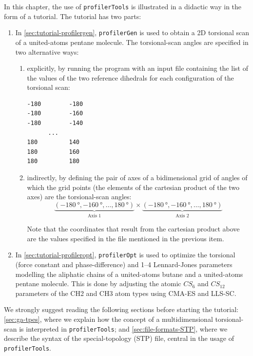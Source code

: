 \documentclass[10pt,a4paper,openany]{memoir}
\numberwithin{equation}{section}
\newcommand{\profileropt}[0]{\texttt{profilerOpt}}
\newcommand{\profilergen}[0]{\texttt{profilerGen}}
\newcommand{\profilertools}[0]{\texttt{profilerTools}}
\begin{document}
In this chapter, the use of \profilertools{} is illustrated in a didactic way in
the form of a tutorial.
%
The tutorial has two parts:
\begin{enumerate}

\item In \autoref{sec:tutorial-profilergen}, \profilergen{} is used to obtain a
  2D torsional scan of a united-atoms pentane molecule. The torsional-scan
  angles are specified in two alternative ways:

  \begin{enumerate}

  \item explicitly, by running the program with an input file containing the
    list of the values of the two reference dihedrals for each configuration of
    the torsional scan:

\begin{lstlisting}
-180        -180
-180        -160
-180        -140
      ...   
180         140
180         160
180         180
\end{lstlisting}

  \item indirectly, by defining the pair of axes of a bidimensional
    grid of angles of which the grid points (the elements of the
    cartesian product of the two axes) are the torsional-scan angles:
    $$\underbrace{(\SI{-180}{\degree},\SI{-160}{\degree},\ldots,\SI{180}{\degree})}_\text{Axis 1}
    \times
    \underbrace{(\SI{-180}{\degree},\SI{-160}{\degree},\ldots,\SI{180}{\degree})}_\text{Axis 2}$$

    Note that the coordinates that result from the cartesian product above are
    the values specified in the file mentioned in the previous item.

\end{enumerate}
  
\item In \autoref{sec:tutorial-profileropt}, \profileropt{} is used to
  optimize the torsional (force constant and phase-difference) and
  1--4 Lennard-Jones parameters modelling the aliphatic chains of a
  united-atoms butane and a united-atoms pentane molecule.  This is
  done by adjusting the atomic $CS_6$ and $CS_{12}$ parameters of the
  CH2 and CH3 atom types using CMA-ES and LLS-SC.

\end{enumerate}

We strongly suggest reading the following sections before starting the tutorial:
\autoref{sec:ga-tpes}, where we explain how the concept of a multidimensional
torsional-scan is interpreted in \profilertools{}; and
\autoref{sec:file-formats-STP}, where we describe the syntax of the
special-topology (STP) file, central in the usage of \profilertools{}.  
\end{document}

